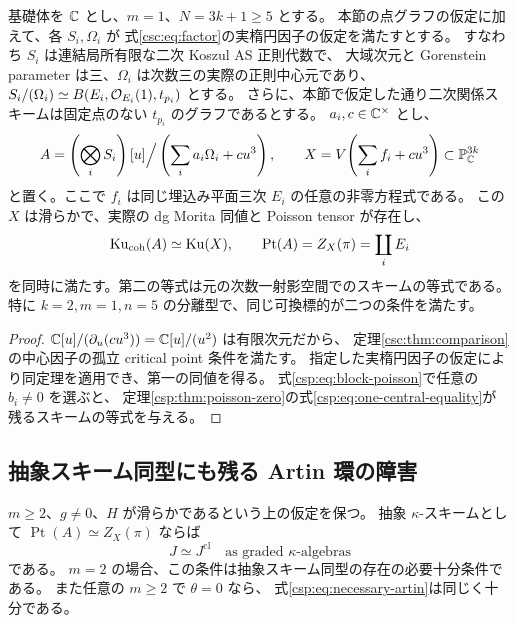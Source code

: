 \begin{corollary}[中心変数一つの分離型における同時存在]
\label{csp:cor:simultaneous-one-center}
基礎体を $\mathbb C$ とし、$m=1$、$N=3k+1\ge5$ とする。
本節の点グラフの仮定に加えて、各 $S_i,\Omega_i$ が
式\eqref{csc:eq:factor}の実楕円因子の仮定を満たすとする。
すなわち $S_i$ は連結局所有限な二次 Koszul AS 正則代数で、
大域次元と Gorenstein parameter は三、$\Omega_i$ は次数三の実際の正則中心元であり、
$S_i/(\Omega_i)\simeq B(E_i,\mathcal O_{E_i}(1),t_{p_i})$ とする。
さらに、本節で仮定した通り二次関係スキームは固定点のない
$t_{p_i}$ のグラフであるとする。
$a_i,c\in\mathbb C^\times$ とし、
\[
 A=\left(\bigotimes_iS_i\right)[u]
       \Big/\left(\sum_i a_i\Omega_i+cu^3\right),\qquad
 X=V\!\left(\sum_i f_i+cu^3\right)\subset\mathbb P^{3k}_\mathbb C
\]
と置く。ここで $f_i$ は同じ埋込み平面三次 $E_i$ の任意の非零方程式である。
この $X$ は滑らかで、実際の dg Morita 同値と Poisson tensor が存在し、
\begin{equation}\label{csp:eq:simultaneous-one-center}
 \operatorname{Ku}_{\mathrm{coh}}(A)\simeq\operatorname{Ku}(X),\qquad
 \operatorname{Pt}(A)=Z_X(\pi)=\coprod_iE_i
\end{equation}
を同時に満たす。第二の等式は元の次数一射影空間でのスキームの等式である。
特に $k=2,m=1,n=5$ の分離型で、同じ可換標的が二つの条件を満たす。
\end{corollary}

\begin{proof}
$\mathbb C[u]/(\partial_u(cu^3))=\mathbb C[u]/(u^2)$ は有限次元だから、
定理\ref{csc:thm:comparison}の中心因子の孤立 critical point 条件を満たす。
指定した実楕円因子の仮定により同定理を適用でき、第一の同値を得る。
式\eqref{csp:eq:block-poisson}で任意の $b_i\ne0$ を選ぶと、
定理\ref{csp:thm:poisson-zero}の式\eqref{csp:eq:one-central-equality}が
残るスキームの等式を与える。
\end{proof}

\subsection{抽象スキーム同型にも残る Artin 環の障害}

\begin{proposition}
\label{csp:prop:abstract-obstruction}
$m\ge2$、$g\ne0$、$H$ が滑らかであるという上の仮定を保つ。
抽象 $\kappa$-スキームとして
$\operatorname{Pt}(A)\simeq Z_X(\pi)$ ならば
\begin{equation}\label{csp:eq:necessary-artin}
 J\simeq J^{\mathrm{cl}}
 \quad\text{as graded }\kappa\text{-algebras}
\end{equation}
である。
$m=2$ の場合、この条件は抽象スキーム同型の存在の必要十分条件である。
また任意の $m\ge2$ で $\theta=0$ なら、
式\eqref{csp:eq:necessary-artin}は同じく十分である。
\end{proposition}

